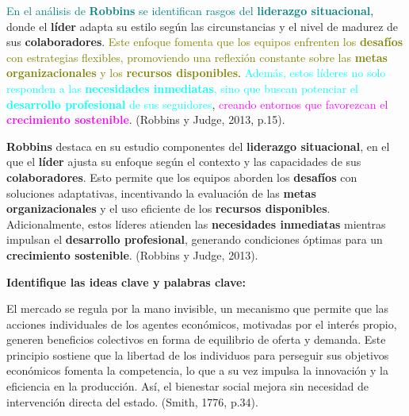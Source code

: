 \documentclass[
11pt, %
]{beamer}
\begin{document}
\begin{frame}
	\begin{block}{} %
		\textcolor{teal}{En el análisis de \textbf{Robbins} se identifican rasgos del \textbf{liderazgo situacional}}, donde el \textbf{líder} adapta su estilo según las circunstancias y el nivel de madurez de sus \textbf{colaboradores}. \textcolor{olive}{Este enfoque fomenta que los equipos enfrenten los \textbf{desafíos} con estrategias flexibles, promoviendo una reflexión constante sobre las \textbf{metas organizacionales} y los \textbf{recursos disponibles}}. \textcolor{cyan}{Además, estos líderes no solo responden a las \textbf{necesidades inmediatas}, sino que buscan potenciar el \textbf{desarrollo profesional} de sus seguidores}, \textcolor{magenta}{creando entornos que favorezcan el \textbf{crecimiento sostenible}}. (Robbins y Judge, 2013, p.15).
	\end{block}
\end{frame}

\begin{frame}
	\begin{block}{} %
		\textbf{Robbins} destaca en su estudio componentes del \textbf{liderazgo situacional}, en el que el \textbf{líder} ajusta su enfoque según el contexto y las capacidades de sus \textbf{colaboradores}. Esto permite que los equipos aborden los \textbf{desafíos} con soluciones adaptativas, incentivando la evaluación de las \textbf{metas organizacionales} y el uso eficiente de los \textbf{recursos disponibles}. Adicionalmente, estos líderes atienden las \textbf{necesidades inmediatas} mientras impulsan el \textbf{desarrollo profesional}, generando condiciones óptimas para un \textbf{crecimiento sostenible}. (Robbins y Judge, 2013).
	\end{block}
\end{frame}

\begin{frame}
	\textbf{Identifique las ideas clave y palabras clave:}
	\begin{block}{} %
		El mercado se regula por la mano invisible, un mecanismo que permite que las acciones individuales de los agentes económicos, motivadas por el interés propio, generen beneficios colectivos en forma de equilibrio de oferta y demanda. Este principio sostiene que la libertad de los individuos para perseguir sus objetivos económicos fomenta la competencia, lo que a su vez impulsa la innovación y la eficiencia en la producción. Así, el bienestar social mejora sin necesidad de intervención directa del estado. (Smith, 1776, p.34).
	\end{block}
\end{frame}
\end{document}
